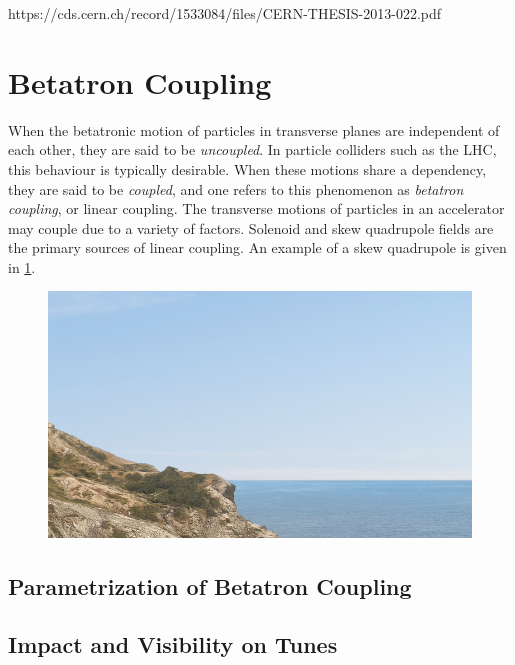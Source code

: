 https://cds.cern.ch/record/1533084/files/CERN-THESIS-2013-022.pdf


\section{Betatron Coupling}

When the betatronic motion of particles in transverse planes are independent of each other, they are said to be \emph{uncoupled}.
In particle colliders such as the LHC, this behaviour is typically desirable.
When these motions share a dependency, they are said to be \emph{coupled}, and one refers to this phenomenon as \emph{betatron coupling}, or linear coupling.
The transverse motions of particles in an accelerator may couple due to a variety of factors.
Solenoid and skew quadrupole fields are the primary sources of linear coupling.
An example of a skew quadrupole is given in \cref{figure:skew_quadrupole}.

\begin{figure}
    \begin{center}
    \includegraphics[width = 0.9\linewidth]{Figures/placeholder.png}
    \caption{}
    \label{figure:skew_quadrupole}
    \end{center}
\end{figure}

\subsection{Parametrization of Betatron Coupling}


\subsection{Impact and Visibility on Tunes}

